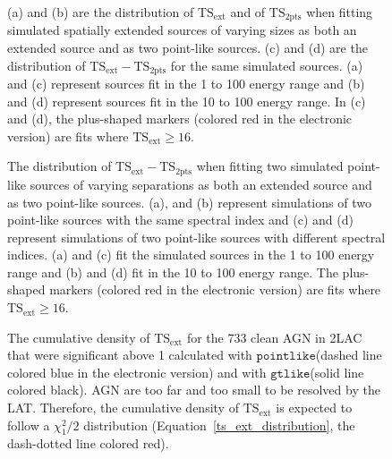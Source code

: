 \documentclass[12pt,preprint]{aastex}
\newif\ifcolorfigure
\newcommand{\gev}{\text{GeV}\xspace}
\newcommand{\tsext}{{\ensuremath{\text{TS}_{\text{ext}}}}\xspace}
\newcommand{\tsinc}{\ensuremath{\text{TS}_{\text{2pts}}}\xspace}
\newcommand{\gtlike}{\ensuremath{\mathtt{gtlike}}\xspace}
\newcommand{\pointlike}{\ensuremath{\mathtt{pointlike}}\xspace}
\begin{document}
\clearpage
\begin{figure}
    \ifcolorfigure
    \plotone{mc_plots/confusion_extended_plot_color.eps}
    \else
    \fi
    \caption{
    (a) and (b) are the distribution of \tsext and of \tsinc when
    fitting simulated spatially extended sources of varying sizes as
    both an extended source and as two point-like sources.  (c) and
    (d) are the distribution of $\tsext-\tsinc$ for the same simulated sources.
    (a) and (c) represent sources fit in the 1 \gev to 100 \gev energy
    range and (b) and (d) represent sources fit in the 10 \gev to
    100 \gev energy range.  In (c) and (d), the plus-shaped markers
    (colored red in the electronic version) are fits where $\tsext\ge16$.
    }\label{confusion_extended_plot}
  \end{figure}


\clearpage
\begin{figure}
    \ifcolorfigure
    \plotone{mc_plots/confusion_2pts_plot_color.eps}
    \else
    \fi
    \caption{
    The distribution of $\tsext-\tsinc$ when fitting two simulated
    point-like sources of varying separations as
    both an extended source and as two point-like sources.  (a),
    and (b) represent simulations of two point-like sources with the
    same spectral index and (c) and (d) represent simulations of two
    point-like sources with different spectral indices.  (a) and (c)
    fit the simulated sources in the 1 \gev to 100 \gev energy range
    and (b) and (d) fit in the 10 \gev to 100 \gev energy range.
    The plus-shaped markers (colored red in the electronic version)
    are fits where $\tsext\ge16$.
    }\label{confusion_2pts_plot}
  \end{figure}


\clearpage
\begin{figure}
    \ifcolorfigure
      \plotone{source_plots/agn_color.eps}
    \else
    \fi
    \caption{The cumulative density of \tsext for the 733 clean
    AGN in 2LAC that were significant above 1 \gev calculated with \pointlike (dashed line
    colored blue in the electronic version)
    and with \gtlike (solid line colored black).  AGN are too far
    and too small to be resolved by the LAT. Therefore, the cumulative
    density of $\tsext$ is expected to follow a $\chi^2_1/2$ distribution
    (Equation~\ref{ts_ext_distribution}, the dash-dotted line colored
    red).
    }\label{agn_ts_ext}
  \end{figure}
\end{document}
